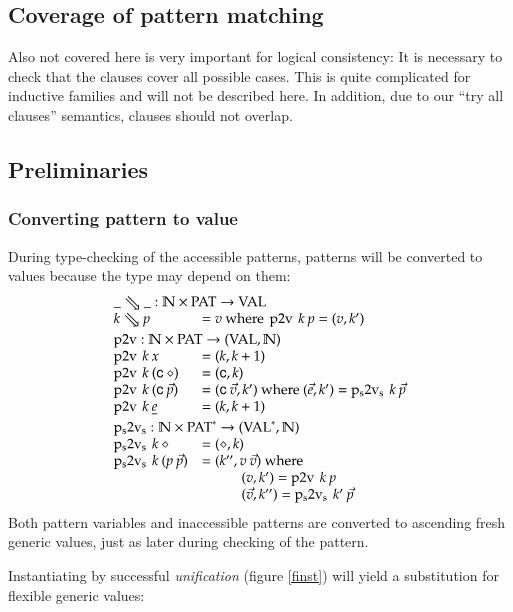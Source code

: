 \subsection{Coverage of pattern matching}
Also not covered here is very important for logical consistency:
It is necessary to check that the clauses cover all possible cases.
This is quite complicated \cite{norell:thesis,schurmann03coverage} for inductive families and will not be described here.
In addition, due to our ``try all clauses'' semantics, clauses should not overlap.

\subsection{Preliminaries}


\subsubsection{Converting pattern to value}
During type-checking of the accessible patterns, patterns will be converted to values because the type may depend on them:
\[
\begin{array}{ll}
\multicolumn{2}{l}{\ptv{\_}{\_}: \cN \times \Pat \ra \Val}\\
\ptv{k}{p} & = v \mbox{ where } \ptvx \: k \: p = (v,k')
\vs\\ 
\multicolumn{2}{l}{\ptvx : \cN \times \Pat \ra (\Val,\cN)}\\
\ptvx \: k \:x & = (k,k+1) \\
\ptvx \: k \: (\cc \: \diamond) & = (\cc,k) \\
\ptvx \: k \: (\cc \: \vec{p}) & = (\cc \: \vec{v},k') \mbox{ where } (\vec{e},k') = \pstvs \: k \: \vec{p}\\
\ptvx \: k \: \inacc{e} & = (k,k+1) 
\vs\\
\multicolumn{2}{l}{\pstvs : \cN \times \ves{\Pat} \ra (\ves{\Val},\cN)}\\
\pstvs \: k \: \diamond & = (\diamond,k) \\
\pstvs \: k \: (p \: \vec{p}) & = (k'', v \: \vec{v}) \mbox{ where } \\
& \spcx (v,k') = \ptvx \: k \: p \\
& \spcx (\vec{v},k'') = \pstvs \: k' \: \vec{p}  
\end{array}
\]
Both pattern variables and inaccessible patterns are converted to ascending fresh generic values, just as later during checking of the pattern.

Instantiating by successful \emph{unification} (figure \ref{finst}) will yield a substitution for flexible generic values:
